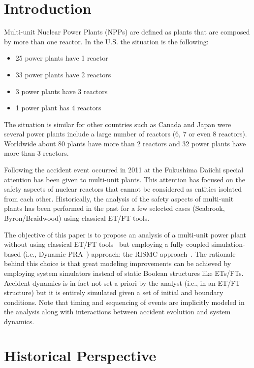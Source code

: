 \section{Introduction}
\label{sec:introduction}

Multi-unit Nuclear Power Plants (NPPs) are defined as plants that are composed by more than one reactor. 
In the U.S. the situation is the following:
\begin{itemize}
  \item 25 power plants have 1 reactor
  \item 33 power plants have 2 reactors
  \item 3 power plants have 3 reactors
  \item 1 power plant has 4 reactors
\end{itemize}
The situation is similar for other countries such as Canada and Japan were 
several power plants include a large number of reactors (6, 7 or even 8 reactors). 
Worldwide about 80 plants have more than 2 reactors and 32 power plants have more than 3 reactors. 

Following the accident event occurred in 2011 at the Fukushima Daiichi special 
attention has been given to multi-unit plants. This attention has focused on the 
safety aspects of nuclear reactors that cannot be considered as entities isolated from each other. 
Historically, the analysis of the safety aspects of multi-unit plants has been performed 
in the past for a few selected cases (Seabrook, Byron/Braidwood) using classical ET/FT tools. 

The objective of this paper is to propose an analysis of a multi-unit power plant without 
using classical ET/FT tools~\cite{Nureg1150} but employing a fully coupled simulation-based 
(i.e., Dynamic PRA~\cite{DynamicReliabilityMonteCarlo}) approach: 
the RISMC approach~\cite{RISMC,mandelliNewAlgo}. 
The rationale behind this choice is that great modeling improvements can be achieved by 
employing system simulators instead of static Boolean structures like ETs/FTs. 
Accident dynamics is in fact not set a-priori by the analyst (i.e., in an ET/FT structure) 
but it is entirely simulated given a set of initial and boundary conditions. Note that timing and 
sequencing of events are implicitly modeled in the analysis along with interactions between 
accident evolution and system dynamics.

\section{Historical Perspective}
\label{sec:historicalPerspective}


